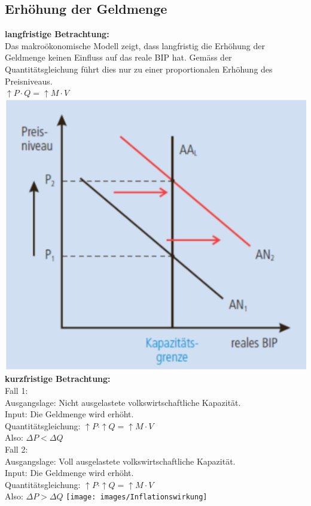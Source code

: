 \subsection{Erhöhung der Geldmenge}
\begin{multicols}{2}
\textbf{langfristige Betrachtung:}\\
Das makroökonomische Modell zeigt, dass langfristig die Erhöhung der Geldmenge keinen Einfluss auf das reale BIP hat. Gemäss der Quantitätsgleichung führt dies nur zu einer proportionalen Erhöhung des Preisniveaus.\\
$\uparrow P \cdot Q = \uparrow M \cdot V$
\includegraphics[width=\linewidth]{images/geldmengenerhoehung.png}
\vfill\null
\columnbreak
\textbf{kurzfristige Betrachtung:}\\
Fall 1:\\
Ausgangslage: Nicht ausgelastete volkswirtschaftliche Kapazität.\\
Input: Die Geldmenge wird erhöht.\\
Quantitätsgleichung: $\uparrow P \cdot \uparrow Q = \uparrow M \cdot V$\\
Also: $\Delta P < \Delta Q$\\
Fall 2:\\
Ausgangslage: Voll ausgelastete volkswirtschaftliche Kapazität.\\
Input: Die Geldmenge wird erhöht.\\
Quantitätsgleichung: $\uparrow P \cdot \uparrow Q = \uparrow M \cdot V$\\
Also: $\Delta P > \Delta Q$
\texttt{[image: images/Inflationswirkung]}
\end{multicols}

